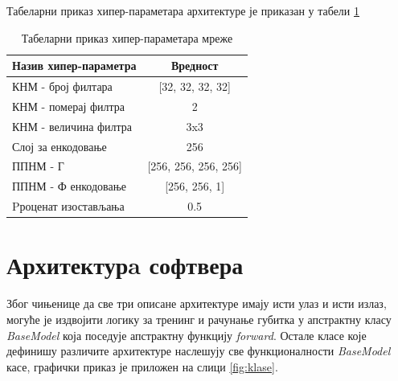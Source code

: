 \documentclass[a4paper, 12pt, master, utf8]{etf}
\begin{document}
Табеларни приказ хипер-параметара архитектуре је приказан у табели \ref{tab:wren}

\begin{table}[H]
    \centering
    \begin{tabular}{l | c}
    \hline
    Назив хипер-параметра & Вредност\\
    \hline
        КНМ - број филтара & [32, 32, 32, 32]\\
        КНМ - померај филтра & 2\\
        КНМ - величина филтра & 3x3\\
        Слој за енкодовање & 256\\
        ППНМ - Г & [256, 256, 256, 256]\\
        ППНМ - Ф енкодовање & [256, 256, 1]\\
        Pроценат изостављања & 0.5
    \end{tabular}
    \caption{Табеларни приказ хипер-параметара мреже}
    \label{tab:wren}
\end{table}


\section{Архитектурa софтвера}
\label{sec:41}

Због чињенице да све три описане архитектуре имају исти улаз и исти излаз, могуће је издвојити логику за тренинг и рачунање губитка у апстрактну класу \textit{BaseModel} која поседује апстрактну функцију \textit{forward}. 
Остале класе које дефинишу различите архитектуре наслешују све функционалности \textit{BaseModel} касе, графички приказ је приложен на слици \ref{fig:klase}.
\end{document}
